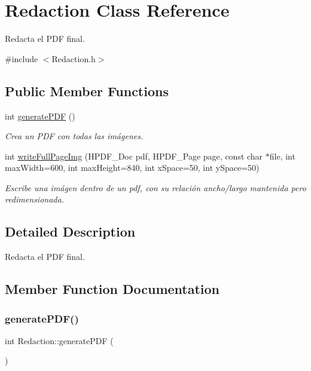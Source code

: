 \hypertarget{classRedaction}{}\section{Redaction Class Reference}
\label{classRedaction}


Redacta el P\+DF final.  




{\ttfamily \#include $<$Redaction.\+h$>$}

\subsection*{Public Member Functions}
\begin{DoxyCompactItemize}
\item 
int \mbox{\hyperlink{classRedaction_a4659115b2df63c9e0694c7f7cf325ff6}{generate\+P\+DF}} ()
\begin{DoxyCompactList}\small\item\em Crea un P\+DF con todas las imágenes. \end{DoxyCompactList}\item 
int \mbox{\hyperlink{classRedaction_aac938c179683d6862f3f853c346a7b32}{write\+Full\+Page\+Img}} (H\+P\+D\+F\+\_\+\+Doc pdf, H\+P\+D\+F\+\_\+\+Page page, const char $\ast$file, int max\+Width=600, int max\+Height=840, int x\+Space=50, int y\+Space=50)
\begin{DoxyCompactList}\small\item\em Escribe una imágen dentro de un pdf, con su relación ancho/largo mantenida pero redimensionada. \end{DoxyCompactList}\end{DoxyCompactItemize}


\subsection{Detailed Description}
Redacta el P\+DF final. 

\subsection{Member Function Documentation}
\mbox{\label{classRedaction_a4659115b2df63c9e0694c7f7cf325ff6}} 
\subsubsection{\texorpdfstring{generate\+P\+D\+F()}{generatePDF()}}
{\footnotesize\ttfamily int Redaction\+::generate\+P\+DF (\begin{DoxyParamCaption}{ }\end{DoxyParamCaption})\hspace{0.3cm}{\ttfamily [inline]}}



